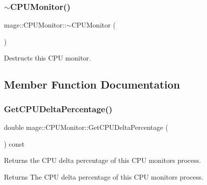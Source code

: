 \subsubsection{\texorpdfstring{$\sim$\+C\+P\+U\+Monitor()}{~CPUMonitor()}}
{\footnotesize\ttfamily mage\+::\+C\+P\+U\+Monitor\+::$\sim$\+C\+P\+U\+Monitor (\begin{DoxyParamCaption}{ }\end{DoxyParamCaption})\hspace{0.3cm}{\ttfamily [default]}}

Destructs this C\+PU monitor. 

\subsection{Member Function Documentation}
\hypertarget{classmage_1_1_c_p_u_monitor_ad8d7fb2aac9a2b9b8b25b8f3ef8c1eac}{}\label{classmage_1_1_c_p_u_monitor_ad8d7fb2aac9a2b9b8b25b8f3ef8c1eac} 
\subsubsection{\texorpdfstring{Get\+C\+P\+U\+Delta\+Percentage()}{GetCPUDeltaPercentage()}}
{\footnotesize\ttfamily double mage\+::\+C\+P\+U\+Monitor\+::\+Get\+C\+P\+U\+Delta\+Percentage (\begin{DoxyParamCaption}{ }\end{DoxyParamCaption}) const\hspace{0.3cm}{\ttfamily [noexcept]}}

Returns the C\+PU delta percentage of this C\+PU monitor\textquotesingle{}s process.

\begin{DoxyReturn}{Returns}
The C\+PU delta percentage of this C\+PU monitor\textquotesingle{}s process. 
\end{DoxyReturn}
\hypertarget{classmage_1_1_c_p_u_monitor_a2bf9e44d0b1114c53a031ba66c2a93bf}{}\label{classmage_1_1_c_p_u_monitor_a2bf9e44d0b1114c53a031ba66c2a93bf} 
